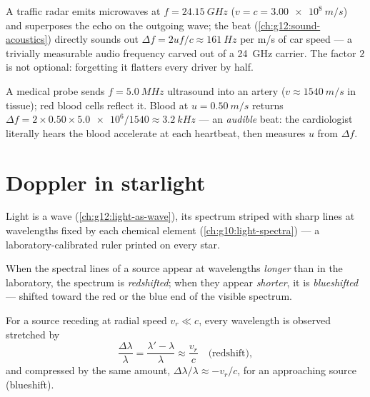 \begin{example}\label{ex:g12:doppler-effect:radar}
A traffic radar emits microwaves at $f = \qty{24.15}{GHz}$ ($v = c = \qty{3.00e8}{m/s}$)
and superposes the echo on the outgoing wave; the beat (\cref{ch:g12:sound-acoustics})
directly sounds out $\Delta f = 2uf/c \approx \qty{161}{Hz}$ per \unit{m/s} of car speed
--- a trivially measurable audio frequency carved out of a \qty{24}{GHz} carrier. The
factor $2$ is not optional: forgetting it flatters every driver by half.
\end{example}

\begin{example}\label{ex:g12:doppler-effect:ultrasound}
A medical probe sends $f = \qty{5.0}{MHz}$ ultrasound into an artery
($v \approx \qty{1540}{m/s}$ in tissue); red blood cells reflect it. Blood at
$u = \qty{0.50}{m/s}$ returns $\Delta f = 2 \times 0.50 \times \num{5.0e6}/1540 \approx
\qty{3.2}{kHz}$ --- an \emph{audible} beat: the cardiologist literally hears the blood
accelerate at each heartbeat, then measures $u$ from $\Delta f$.
\end{example}

\section{Doppler in starlight}

Light is a wave (\cref{ch:g12:light-as-wave}), its spectrum striped with sharp lines at
wavelengths fixed by each chemical element (\cref{ch:g10:light-spectra}) --- a
laboratory-calibrated ruler printed on every star.

\begin{definition}\label{def:g12:doppler-effect:redshift}
When the spectral lines of a source appear at wavelengths \emph{longer} than in the
laboratory, the spectrum is \emph{redshifted}; when they appear \emph{shorter},
it is \emph{blueshifted} --- shifted toward the red or the blue end of
the visible spectrum.
\end{definition}

\begin{proposition}\label{prop:g12:doppler-effect:light}
For a source receding at radial speed $v_r \ll c$, every wavelength is observed
stretched by
\[ \frac{\Delta \lambda}{\lambda} = \frac{\lambda' - \lambda}{\lambda} \approx \frac{v_r}{c} \quad \text{(redshift)}, \]
and compressed by the same amount, $\Delta\lambda/\lambda \approx -v_r/c$, for an approaching
source (blueshift).
\end{proposition}
\admitted

